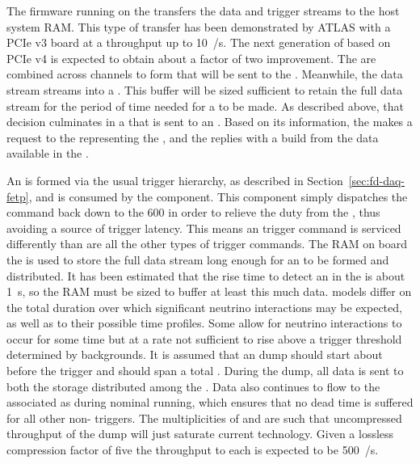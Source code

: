The firmware running on the   transfers the data
and trigger streams to the host system RAM. 
This type of transfer has been demonstrated by ATLAS with a PCIe v3
 board at a throughput up to \SI{10}{\GB/\s}. 
The next generation of  based on PCIe v4 %
is expected to
obtain about a factor of two improvement.
The  are combined across channels to form 
 that will be sent to the .
Meanwhile, the data stream streams into a . 
This buffer will be sized sufficient to retain the full data stream
for the period of time needed for a  to be made. 
As described above, that decision culminates in a 
that is sent to an . 
Based on its information, the  makes a request to the
 representing the , and %
the   replies with a 
 build from the data available in the .

An   is formed via the usual trigger
hierarchy, as described in %
Section~\ref{sec:fd-daq-fetp},
and is consumed by the  component. 
This component simply dispatches the command back down to the \num{600}
 in order to relieve the duty from the , 
thus avoiding a source of trigger latency.
This means an  trigger command is serviced differently than
are all the other types of trigger commands. %
The RAM on board the  is used to store the full data
stream long enough for an   to be formed
and distributed. 
It has been estimated that the rise time to detect an  in
the   is about \SI{1}{\s}, so the RAM
must be sized to buffer at least this much data.
 models differ on the total duration over which significant
neutrino interactions may be expected, as well as to their possible
time profiles. 
Some allow for  neutrino interactions to occur for some
time but at a rate not sufficient to rise above a trigger threshold
determined by  backgrounds. 
It is assumed that an  dump should start about \snbpretime
before the  trigger and should span a total \snbtime.
During the dump, all data is sent to both the  storage
distributed among the . 
Data also continues to flow to the associated  as during
nominal running, which ensures  that no dead time is suffered for all other
non- triggers. 
The multiplicities of  and  are such that
uncompressed throughput of the  dump will just saturate
current technology. 
Given a lossless compression factor of five the throughput to each  
is expected to be \SI{500}{\MB/\s}.

